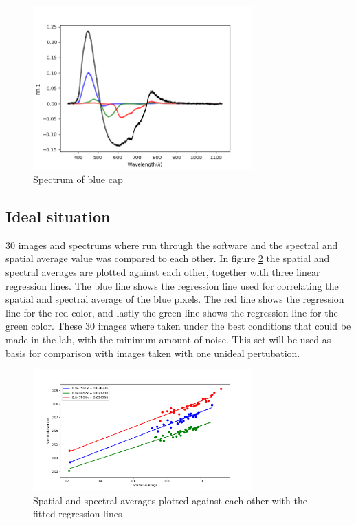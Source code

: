 \begin{figure}[h]
    \centering
    \includegraphics[width=0.75\textwidth]{Plots/blue_cap_rr_minus_one_with_qe.png}    
    \caption{Spectrum of blue cap}
    \label{fig:blue_cap_spectrum}
\end{figure}


\subsection{Ideal situation}
\label{sec:ideal_situation}
30 images and spectrums where run through the software and the spectral and spatial average value was compared to each other. In figure \ref{fig:spectral_vs_spatial_values} the spatial and spectral averages are plotted against each other, together with three linear regression lines. The blue line shows the regression line used for correlating the spatial and spectral average of the blue pixels. The red line shows the regression line for the red color, and lastly the green line shows the regression line for the green color. These 30 images where taken under the best conditions that could be made in the lab, with the minimum amount of noise. This set will be used as basis for comparison with images taken with one unideal pertubation. 

\begin{figure}[h]
    \centering
    \includegraphics[width=0.75\textwidth]{Plots/spectral_vs_spatial_average_with_regression.png}
    \caption{Spatial and spectral averages plotted against each other with the fitted regression lines}
    \label{fig:spectral_vs_spatial_values}
\end{figure}


